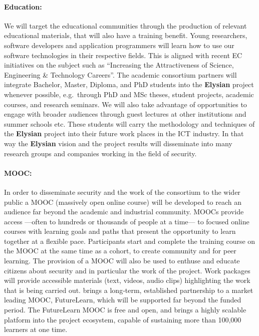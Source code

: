 \documentclass[a4paper,11pt]{article}
\newcommand{\project}[1]{\textbf{#1}\xspace}
\newcommand{\SECURITY}{\project{Elysian}}
\newcommand{\TheProject}{\SECURITY}
\begin{document}
\paragraph{Education:} We will target 
the educational communities through the production of relevant educational materials, that will
also have a training benefit. Young researchers, software
 developers and application programmers will learn how to
 use our software technologies in their
 respective fields. This is aligned with recent EC
 initiatives on the subject such as ``Increasing the Attractiveness
 of Science, Engineering \& Technology Careers''.
 The academic consortium partners will integrate Bachelor,
 Master, Diploma, and PhD students into the \TheProject{}
 project whenever possible, e.g.~through PhD and MSc theses, student
 projects, academic courses, and research seminars. 
 We will also take advantage of opportunities to engage with broader
 audiences through guest lectures at other institutions and summer schools etc.
 These students will
 carry the methodology and techniques of the \TheProject{}
 project into their future work places in the ICT industry.
 In that way the \TheProject{} vision and the project
 results will disseminate into many research groups and
 companies working in the field of security. 
 \paragraph{MOOC:}In order to disseminate security and the work of the consortium to the wider public a MOOC (massively open online course) will be developed to reach an audience far beyond the academic and industrial community.  MOOCs provide access ---often to hundreds or thousands of people at a time--- to focused online courses with learning goals and paths that present the opportunity to learn together at a flexible pace. Participants start and complete the training course on the MOOC at the same time as a cohort, to create community and for peer learning. The provision of a MOOC will also be
used to enthuse and educate citizens about security and in particular the work of the project.  Work packages will provide accessible materials (text, videos, audio clips) highlighting the work that is being carried out. \UODshort{} brings a long‐term, established partnership to a market leading MOOC, FutureLearn, which will be supported far beyond the funded period. The FutureLearn MOOC is free and open, and brings a highly scalable platform into the project ecosystem, capable of sustaining more than 100,000 learners at one time.
\end{document}

